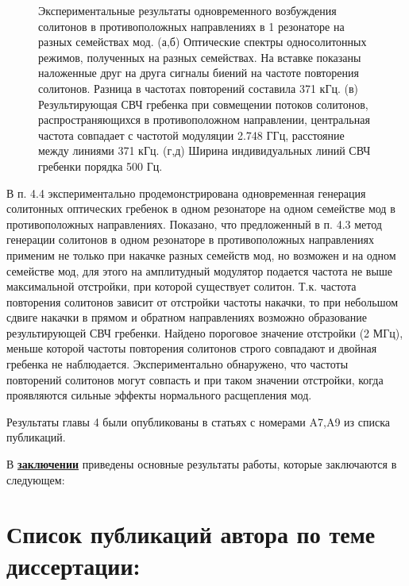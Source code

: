 \begin{figure}[ht]
\begin{minipage}[ht]{1\linewidth}
\end{minipage}
\caption{Экспериментальные результаты одновременного возбуждения солитонов в противоположных направлениях в 1 резонаторе на разных семействах мод. (а,б) Оптические спектры односолитонных режимов, полученных на разных семействах. На вставке показаны наложенные друг на друга сигналы биений на частоте повторения солитонов. Разница в частотах повторений составила 371 кГц. (в) Результирующая СВЧ гребенка при совмещении потоков солитонов, распространяющихся в противоположном направлении, центральная частота совпадает с частотой модуляции 2.748 ГГц, расстояние между линиями 371 кГц. (г,д) Ширина индивидуальных линий СВЧ гребенки порядка 500 Гц.}
\label{counter_prop_results}
\end{figure}

В п. 4.4 экспериментально продемонстрирована одновременная генерация солитонных оптических гребенок в одном резонаторе на одном семействе мод в противоположных направлениях. Показано, что предложенный в п. 4.3 метод генерации солитонов в одном резонаторе в противоположных направлениях применим не только при накачке разных семейств мод, но возможен и на одном семействе мод, для этого на амплитудный модулятор подается частота не выше максимальной отстройки, при которой существует солитон. Т.к. частота повторения солитонов зависит от отстройки частоты накачки, то при небольшом сдвиге накачки в прямом и обратном направлениях возможно образование результирующей СВЧ гребенки. Найдено пороговое значение отстройки (2 МГц), меньше которой частоты повторения солитонов строго совпадают и двойная гребенка не наблюдается. Экспериментально обнаружено, что частоты повторений солитонов могут совпасть и при таком значении отстройки, когда проявляются сильные эффекты нормального расщепления мод.

Результаты главы 4 были опубликованы в статьях с номерами A7,A9 из списка публикаций.

В \underline{\textbf{заключении}} приведены основные результаты работы, которые заключаются в следующем:





\section*{Список публикаций автора по теме диссертации:}

